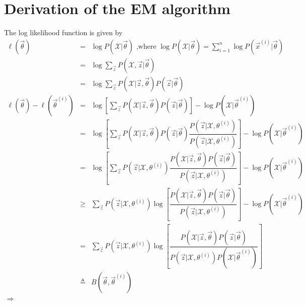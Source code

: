 \section{Derivation of the EM algorithm}
The log likelihood function is given by 
\begin{eqnarray}
\ell(\vec{\theta}) &=& \log{P(\mathcal{X}|\vec{\theta})} \text{ ,where } \log{P(\mathcal{X}|\vec{\theta})}=\sum\limits_{i=1}^{n} \log{{P(\vec{x}^{(i)}|\vec{\theta})}}\nonumber \\
                &=& \log{{\sum\limits_{\vec{z}} P(\mathcal{X},\vec{z}|\vec{\theta})}} \nonumber \\
				&=& \log{{\sum\limits_{\vec{z}} P(\mathcal{X}|\vec{z},\vec{\theta})P(\vec{z}|\vec{\theta})}} \nonumber \\
\ell(\vec{\theta})-\ell(\vec{\theta}^{(i)}) &=& \log\left[\sum\limits_{\vec{z}} P(\mathcal{X}|\vec{z},\vec{\theta})P(\vec{z}|\vec{\theta})\right] - \log{P(\mathcal{X}|\vec{\theta}^{(i)})} \nonumber \\
                &=& \log\left[\sum\limits_{\vec{z}} P(\mathcal{X}|\vec{z},\vec{\theta})P(\vec{z}|\vec{\theta})\dfrac{P(\vec{z}|\mathcal{X},\theta^{(i)})}{P(\vec{z}|\mathcal{X},\theta^{(i)})}\right] - \log{P(\mathcal{X}|\vec{\theta}^{(i)})} \nonumber \\
				&=& \log\left[\sum\limits_{\vec{z}} P(\vec{z}|\mathcal{X},\theta^{(i)})\dfrac{P(\mathcal{X}|\vec{z},\vec{\theta})P(\vec{z}|\vec{\theta})}{P(\vec{z}|\mathcal{X},\theta^{(i)})}\right] - \log{P(\mathcal{X}|\vec{\theta}^{(i)})} \nonumber \\
				&\geq& \sum\limits_{\vec{z}} P(\vec{z}|\mathcal{X},\theta^{(i)})\log\left[\dfrac{P(\mathcal{X}|\vec{z},\vec{\theta})P(\vec{z}|\vec{\theta})}{P(\vec{z}|\mathcal{X},\theta^{(i)})}\right] - \log{P(\mathcal{X}|\vec{\theta}^{(i)})} \nonumber \\
				&=& \sum\limits_{\vec{z}} P(\vec{z}|\mathcal{X},\theta^{(i)})\log\left[\dfrac{P(\mathcal{X}|\vec{z},\vec{\theta})P(\vec{z}|\vec{\theta})}{P(\vec{z}|\mathcal{X},\theta^{(i)})P(\mathcal{X}|\vec{\theta}^{(i)})}\right] \nonumber \\
				&\triangleq& B(\vec{\theta},\vec{\theta}^{(i)}) \nonumber \\
\Rightarrow \nonumber
\end{eqnarray}

